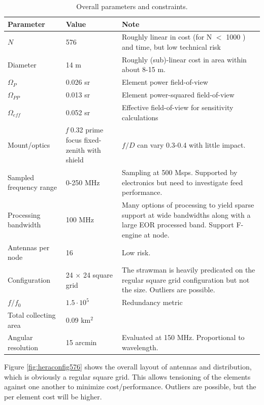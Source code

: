 \documentclass[11pt]{article}
\begin{document}
\begin{table}
\caption{Overall parameters and constraints.}
\label{tab:overall}
\begin{tabular}{|p{3cm}|p{3cm}|p{8cm}|}
\hline
{\bf Parameter} & {\bf Value} & {\bf Note} \\
\hline
$N$  &  576  & Roughly linear in cost (for N $<$ 1000 ) and time, but low technical risk \\ \hline
Diameter & 14 m& Roughly (sub)-linear cost in area within about 8-15 m.  \\ \hline
$\Omega_P$ & 0.026 sr & Element power field-of-view \\ \hline
$\Omega_{PP}$ & 0.013 sr & Element power-squared field-of-view \\ \hline
$\Omega_{eff}$ & 0.052 sr & Effective field-of-view for sensitivity calculations \\ \hline
Mount/optics & {\em f} 0.32 prime focus fixed-zenith with shield & $f/D$ can vary 0.3-0.4 with little impact. \\ \hline
Sampled frequency range & 0-250 MHz &  Sampling at 500 Msps.  Supported by electronics but need to investigate feed performance. \\ \hline
Processing bandwidth & 100 MHz & Many options of processing to yield sparse support at wide bandwidths along with a large EOR processed band.  Support F-engine at node. \\ \hline
Antennas per node & 16	 & Low risk. \\ \hline
Configuration	& 24 $\times$ 24 square grid & The strawman is heavily predicated on the regular square grid configuration but not the size.  Outliers are possible. \\ \hline
$f/f_0$ & $1.5\cdot10^5$ & Redundancy metric \\ \hline
Total collecting area & 0.09 km$^2$ & \\ \hline
Angular resolution & 15 arcmin & Evaluated at 150 MHz. Proportional to wavelength. \\ \hline
\end{tabular}
\end{table}

Figure \ref{fig:heraconfig576} shows the overall layout of antennas and distribution, which is obviously a regular square grid.  This allows tensioning of the elements against one another to minimize cost/performance.  Outliers are possible, but the per element cost will be higher.
\end{document}
